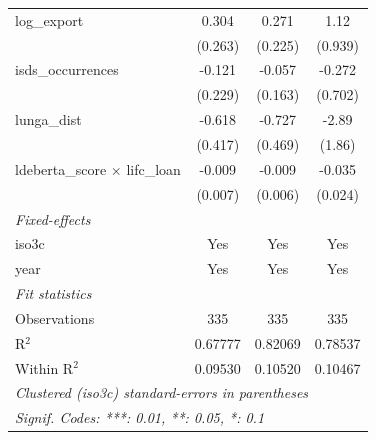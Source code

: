 \begin{tabular}{lccc}
   log\_export                            & 0.304                                       & 0.271                     & 1.12\\   
                                          & (0.263)                                     & (0.225)                   & (0.939)\\   
   isds\_occurrences                      & -0.121                                      & -0.057                    & -0.272\\   
                                          & (0.229)                                     & (0.163)                   & (0.702)\\   
   lunga\_dist                            & -0.618                                      & -0.727                    & -2.89\\   
                                          & (0.417)                                     & (0.469)                   & (1.86)\\   
   ldeberta\_score $\times$ lifc\_loan    & -0.009                                      & -0.009                    & -0.035\\   
                                          & (0.007)                                     & (0.006)                   & (0.024)\\   
   \midrule
   \emph{Fixed-effects}\\
   iso3c                                  & Yes                                         & Yes                       & Yes\\  
   year                                   & Yes                                         & Yes                       & Yes\\  
   \midrule
   \emph{Fit statistics}\\
   Observations                           & 335                                         & 335                       & 335\\  
   R$^2$                                  & 0.67777                                     & 0.82069                   & 0.78537\\  
   Within R$^2$                           & 0.09530                                     & 0.10520                   & 0.10467\\  
   \midrule \midrule
   \multicolumn{4}{l}{\emph{Clustered (iso3c) standard-errors in parentheses}}\\
   \multicolumn{4}{l}{\emph{Signif. Codes: ***: 0.01, **: 0.05, *: 0.1}}\\
\end{tabular}
\par\endgroup


